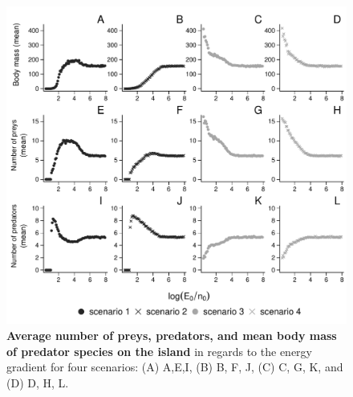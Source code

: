 \begin{figure}[htbp]
\centering
\includegraphics{chapitre4/fig/fig4.pdf}
\caption{\textbf{Average number of preys, predators, and mean body mass
of predator species on the island} in regards to the energy gradient for
four scenarios: (A) A,E,I, (B) B, F, J, (C) C, G, K, and (D) D, H,
L.\label{fig:etib4}}
\end{figure}
